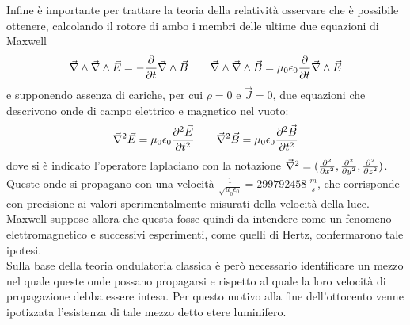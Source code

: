 Infine è importante per trattare la teoria della relatività osservare che è possibile ottenere, calcolando il rotore di ambo 
i membri delle ultime due equazioni di Maxwell
\begin{equation*}
	\vec{\nabla}\wedge\vec{\nabla}\wedge\vec{E}=-\frac{\partial}{\partial t}\vec{\nabla}\wedge\vec{B} 
	\qquad \vec{\nabla}\wedge\vec{\nabla}\wedge\vec{B}=\mu_0\epsilon_0\frac{\partial}{\partial t}
	\vec{\nabla}\wedge\vec{E}
\end{equation*}
e supponendo assenza di cariche, per cui $\rho=0$ e $\vec{J}=0$, due equazioni che descrivono 
onde di campo elettrico e magnetico nel vuoto:
\begin{equation}
	\vec{\nabla}^2\vec{E}=\mu_0\epsilon_0\frac{\partial^2\vec{E}}{\partial t^2} \qquad \vec{\nabla}^2\vec{B}=
	\mu_0\epsilon_0\frac{\partial^2\vec{B}}{\partial t^2}
\end{equation}
dove si è indicato l'operatore laplaciano con la notazione $\vec{\nabla}^2=(\frac{\partial^2 }{\partial x^2},\frac{\partial^2 }{\partial y^2},\frac{\partial^2 }{\partial z^2})$.\\
Queste onde si propagano con una velocità $\frac{1}{\sqrt{\mu_0\epsilon_0}}=299792458\  \frac{m}{s}$, 
che corrisponde con precisione ai valori sperimentalmente misurati della velocità della luce. Maxwell suppose allora che questa fosse quindi da intendere come un fenomeno elettromagnetico e successivi esperimenti, come quelli di Hertz, confermarono tale ipotesi.\\
Sulla base della teoria ondulatoria classica è però necessario identificare un mezzo nel quale queste onde possano 
propagarsi e rispetto al quale la loro velocità di propagazione debba essere intesa. Per questo motivo alla fine dell'ottocento venne ipotizzata l'esistenza di tale mezzo detto etere luminifero.